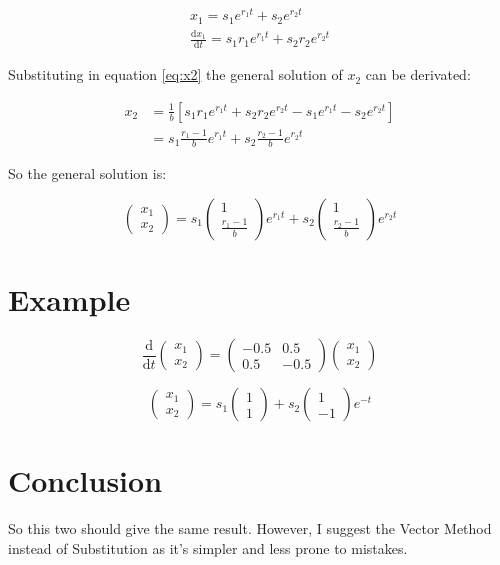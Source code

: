 \documentclass[12pt,letterpaper]{article}
\newcommand{\vectors}[2]{
	\begin{pmatrix}
		#1 \\ #2
	\end{pmatrix}
}
\newcommand{\smatrix}[4]{
	\begin{pmatrix}
		#1 & #2 \\ #3 & #4
	\end{pmatrix}
}
\begin{document}
		\begin{align*}
			x_1 = s_1 e^{r_1 t} + s_2 e^{r_2 t} \\
			\frac{\mathrm{d}x_1}{\mathrm{d}t} = s_1 r_1 e^{r_1 t} + s_2 r_2 e^{r_2 t}
		\end{align*}

		Substituting in equation \ref{eq:x2}    the general solution of $x_2$ can be derivated:

		\begin{align*}
			x_2 &= \frac{1}{b} \left[ s_1 r_1 e^{r_1 t} + s_2 r_2 e^{r_2 t} - s_1 e^{r_1 t} - s_2 e^{r_2 t}\right] \\
			&= s_1 \frac{r_1 - 1}{b} e^{r_1 t} + s_2 \frac{r_2 - 1}{b} e^{r_2 t}
		\end{align*}

		So the general solution is:

		\begin{equation}
			\vectors{x_1}{x_2} = s_1 \vectors{1}{\frac{r_1 - 1}{b}} e^{r_1 t} +s_2 \vectors{1}{\frac{r_2 - 1}{b}} e^{r_2 t}
		\end{equation}

	\section{Example}

		\begin{equation}
			\frac{\mathrm{d}}{\mathrm{d}t} \vectors{x_1}{x_2} = \smatrix{-0.5}{0.5}{0.5}{-0.5} \vectors{x_1}{x_2}
		\end{equation}

		\begin{equation}
			\vectors{x_1}{x_2} = s_1 \vectors{1}{1}  + s_2 \vectors{1}{-1} e^{ - t}
		\end{equation}

	\section{Conclusion}

		So this two should give the same result. However, I suggest the Vector Method instead of Substitution as it's simpler and less prone to mistakes. 

	\nocite{*}
	\printbibliography

	
	
\end{document}
